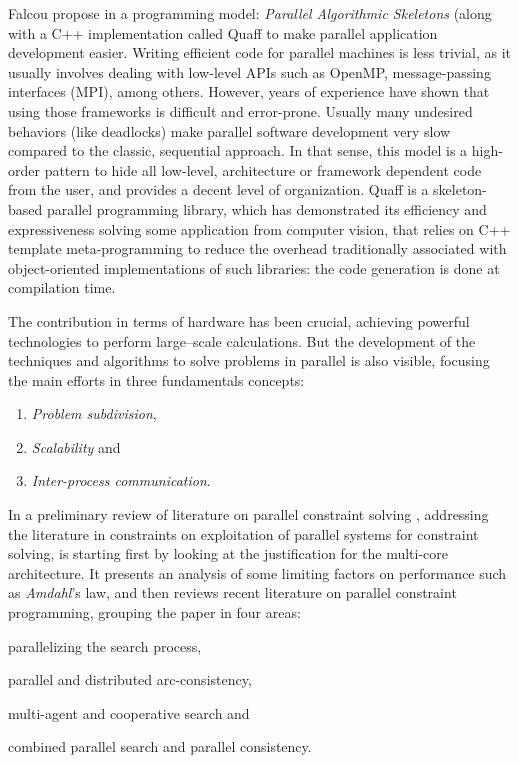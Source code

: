 Falcou propose in \cite{Falcou2009} a programming model: \textit{Parallel Algorithmic Skeletons} (along with a C++ implementation called {\sc Quaff} to make parallel application development easier. Writing efficient code for parallel machines is less trivial, as it usually involves dealing with low-level APIs such as OpenMP, message-passing interfaces (MPI), among others. However, years of experience have shown that using those frameworks is difficult and error-prone. Usually many undesired behaviors (like deadlocks) make parallel software development very slow compared to the classic, sequential approach. In that sense, this model is a high-order pattern to hide all low-level, architecture or framework dependent code from the user, and provides a decent level of organization. {\sc Quaff} is a skeleton-based parallel programming library, which has demonstrated its efficiency and expressiveness solving some application from computer vision, that relies on C++ template meta-programming to reduce the overhead traditionally associated with object-oriented implementations of such libraries: the code generation is done at compilation time.

The contribution in terms of hardware has been crucial, achieving powerful technologies to perform large--scale calculations. But the development of the techniques and algorithms to solve problems in parallel is also visible, focusing the main efforts in three fundamentals concepts: 
\begin{enumerate}%
    \item {\it Problem subdivision},
    \item {\it Scalability} and
    \item {\it Inter-process communication}.
\end{enumerate}%

In a preliminary review of literature on parallel constraint solving \cite{Gent}, addressing the literature in constraints on exploitation of parallel systems for constraint solving, is starting first by looking at the justification for the multi-core architecture. It presents an analysis of some limiting factors on performance such as \textit{Amdahl}'s law, and then reviews recent literature on parallel constraint programming, grouping the paper in four areas: 
\begin{inparaenum}[i)]
	\item parallelizing the search process,  
	\item parallel and distributed arc-consistency, 
	\item multi-agent and cooperative search and
	\item combined parallel search and parallel consistency.
\end{inparaenum}

